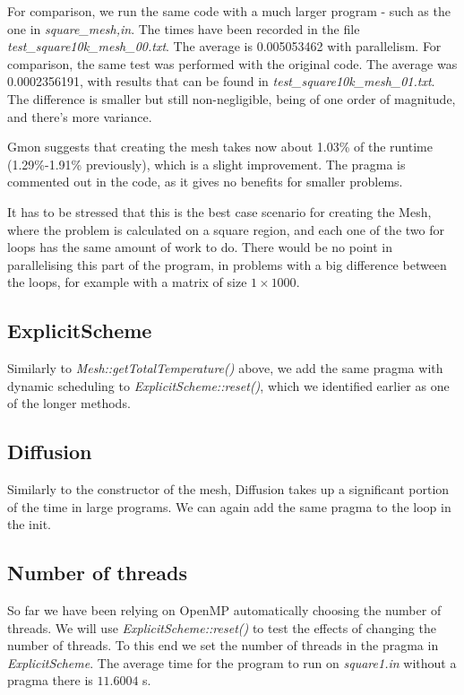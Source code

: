 \documentclass[11pt,journal]{IEEEtran}
\begin{document}
	For comparison, we run the same code with a much larger program - such as the one in \emph{square\_mesh,in}. The times have been recorded in the file \emph{test\_square10k\_mesh\_00.txt}. The average is 0.005053462 with parallelism. For comparison, the same test was performed with the original code. The average was 0.0002356191, with results that can be found in \emph{test\_square10k\_mesh\_01.txt}. The difference is smaller but still non-negligible, being of one order of magnitude, and there's more variance.
	
	Gmon suggests that creating the mesh takes now about 1.03\% of the runtime (1.29\%-1.91\% previously), which is a slight improvement. The pragma is commented out in the code, as it gives no benefits for smaller problems.

	It has to be stressed that this is the best case scenario for creating the Mesh, where the problem is calculated on a square region, and each one of the two for loops has the same amount of work to do. There would be no point in parallelising this part of the program, in problems with a big difference between the loops, for example with a matrix of size $1 \times 1000$.
	
	\subsection{ExplicitScheme}
	
	Similarly to \emph{Mesh::getTotalTemperature()} above, we add the same pragma with dynamic scheduling to \emph{ExplicitScheme::reset()}, which we identified earlier as one of the longer methods. 
	
	\subsection{Diffusion}
	Similarly to the constructor of the mesh, Diffusion takes up a significant portion of the time in large programs. We can again add the same pragma to the loop in the init.
	
	\subsection{Number of threads}
	So far we have been relying on OpenMP automatically choosing the number of threads. We will use \emph{ExplicitScheme::reset()} to test the effects of changing the number of threads. To this end we set the number of threads in the pragma in \emph{ExplicitScheme}. The average time for the program to run on \emph{square1.in} without a pragma there is $11.6004$ s. 
	
\end{document}
